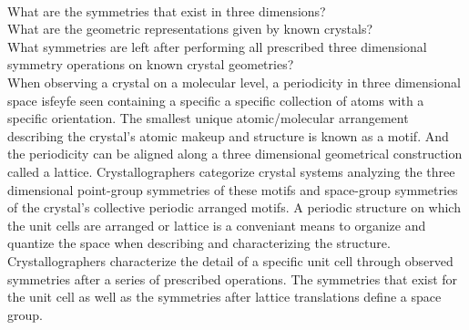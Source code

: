 \\
What are the symmetries that exist in three dimensions?
\\
What are the geometric representations given by known crystals?
\\
What symmetries are left after performing all prescribed three dimensional symmetry operations on known crystal geometries?
\\
When observing a crystal on a molecular level, a periodicity in three dimensional space isfeyfe seen containing a specific a specific collection of atoms with a specific orientation. The smallest unique atomic/molecular arrangement describing the crystal's atomic makeup and structure is known as a motif. And the periodicity can be aligned along a three dimensional geometrical construction called a lattice. Crystallographers categorize crystal systems analyzing the three dimensional point-group symmetries of these motifs and space-group symmetries of the crystal's collective periodic arranged motifs. A periodic structure on which the unit cells are arranged or lattice is a conveniant means to organize and quantize the space when describing and characterizing the structure. Crystallographers characterize the detail of a specific unit cell through observed symmetries after a series of prescribed operations. The symmetries that exist for the unit cell as well as the symmetries after lattice translations define a space group.
